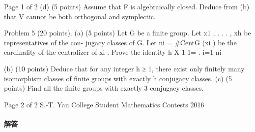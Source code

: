 \documentclass[UTF8,12pt]{ctexart}
\begin{document}
Page 1 of 2 (d) (5 points) Assume that F is algebraically closed. Deduce from (b) that V cannot be both orthogonal and symplectic.

Problem 5 (20 points). (a) (5 points) Let G be a finite group. Let x1 , . . . , xh be representatives of the con- jugacy classes of G. Let ni = \#CentG (xi ) be the cardinality of the centralizer of xi . Prove the identity h X 1 1= . i=1 ni

(b) (10 points) Deduce that for any integer h ≥ 1, there exist only finitely many isomorphism classes of finite groups with exactly h conjugacy classes. (c) (5 points) Find all the finite groups with exactly 3 conjugacy classes.

Page 2 of 2 S.-T. Yau College Student Mathematics Contests 2016

\paragraph{解答}
\end{document}
